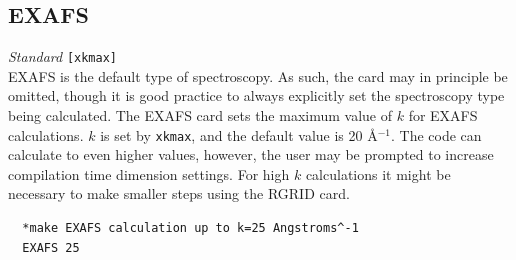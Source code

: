 \documentclass[11pt,oneside]{report} %
\renewcommand{\htmlref}[2]{\hyperlink{#2}{#1}}
\newenvironment{Card}[4]%
      {\vspace{3ex}%
        \subsection{#1}
        \quad\textsl{#3}\newline
        \quad\texttt{#2}\newline%
        \label{card:#4}\\}
      {}
\renewcommand{\htmlref}[2]{{#1}} %
\begin{document}
\begin{Card}{EXAFS}{[xkmax]}{Standard}{exa}
 EXAFS is the default type of spectroscopy.  As such, the card may in principle be omitted, though it is good practice
 to always explicitly set the spectroscopy type being calculated.  The EXAFS card sets the maximum value of $k$ for EXAFS 
calculations. $k$ is set by \texttt{xkmax}, and the default value is 
20 \AA$^{-1}$. The code can calculate to even higher values, however, 
the user may be prompted to increase compilation time dimension settings. For high $k$ calculations it might be necessary 
to make smaller steps using the \htmlref{RGRID}{card:rgr} card.
\begin{verbatim}
  *make EXAFS calculation up to k=25 Angstroms^-1
  EXAFS 25
\end{verbatim}
\end{Card}
\end{document}
